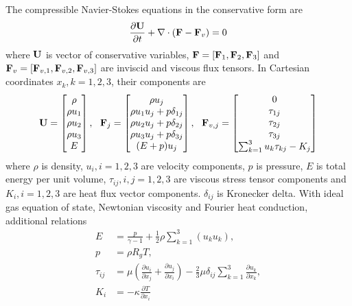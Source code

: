 The compressible Navier-Stokes equations in the conservative form are
\begin{equation}
    \label{eq:NS}
    \frac{\partial \mathbf{U}}{\partial t} +
    \mathbf\nabla \cdot (\mathbf{F} - \mathbf{F}_v)  = 0
\end{equation}
where $\mathbf{U}$ is vector of conservative variables,
$\mathbf{F}=[\mathbf{F}_1,\mathbf{F}_2,\mathbf{F}_3]$ and
$\mathbf{F}_v=[\mathbf{F}_{v,1},\mathbf{F}_{v,2},\mathbf{F}_{v,3}]$
are
inviscid and viscous flux tensors.
In Cartesian coordinates $x_k, k=1,2,3$, 
their components are
\begin{equation}
    \mathbf{U} = \begin{bmatrix}
        \rho \\ \rho u_1 \\ \rho u_2 \\ \rho u_3 \\ E
    \end{bmatrix},\ \
    \mathbf{F}_j = \begin{bmatrix}
        \rho u_j                   \\
        \rho u_1u_j + p\delta_{1j} \\
        \rho u_2u_j + p\delta_{2j} \\
        \rho u_3u_j + p\delta_{3j} \\
        (E+p)u_j                   \\
    \end{bmatrix},\ \
    \mathbf{F}_{v,j} = \begin{bmatrix}
        0                                \\
        \tau_{1j}                        \\
        \tau_{2j}                        \\
        \tau_{3j}                        \\
        \sum_{k=1}^3{u_k\tau_{kj}} - K_j \\
    \end{bmatrix}
\end{equation}
where $\rho$ is density,
$u_i, i=1,2,3$ are velocity components,
$p$ is pressure,
$E$ is total energy per unit volume,
$\tau_{ij}, i,j=1,2,3$ are viscous stress tensor components
and
$K_i, i=1,2,3$ are heat flux vector components.
$\delta_{ij}$ is
Kronecker delta.
With ideal gas equation of state,
Newtonian viscosity and Fourier
heat conduction, additional relations
\begin{equation}
    \begin{aligned}
        E         & = \frac{p}{\gamma -1 } + \frac{1}{2}\rho\sum_{k=1}^{3}(u_ku_k),  \\
        p         & =\rho R_g T                                              ,       \\
        \tau_{ij} & =
        \mu\left(\frac{\partial u_i}{\partial x_j} + \frac{\partial u_j}{\partial x_i}\right)
        -
        \frac{2}{3}\mu \delta_{ij}\sum_{k=1}^{3}{\frac{\partial u_k}{\partial x_k}}, \\
        K_i       & = - \kappa \frac{\partial T}{\partial x_i}
    \end{aligned}
\end{equation}
